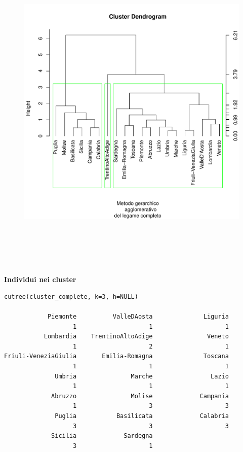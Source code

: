\vspace{5mm}
\begin{figure}[!htbp]
    \centering
    \includegraphics[height=16cm]{ProgettoSAD/capitoli/images/clustering/dendro_clcomp_sudd.pdf}
\end{figure}
\vspace{5mm}

\noindent \textbf{Individui nei cluster}

\vspace{5mm}
\begin{lstlisting}
cutree(cluster_complete, k=3, h=NULL)

            Piemonte          ValleDAosta              Liguria 
                   1                    1                    1 
           Lombardia    TrentinoAltoAdige               Veneto 
                   1                    2                    1 
Friuli-VeneziaGiulia       Emilia-Romagna              Toscana 
                   1                    1                    1 
              Umbria               Marche                Lazio 
                   1                    1                    1 
             Abruzzo               Molise             Campania 
                   1                    3                    3 
              Puglia           Basilicata             Calabria 
                   3                    3                    3 
             Sicilia             Sardegna 
                   3                    1 
\end{lstlisting}
\vspace{5mm}

